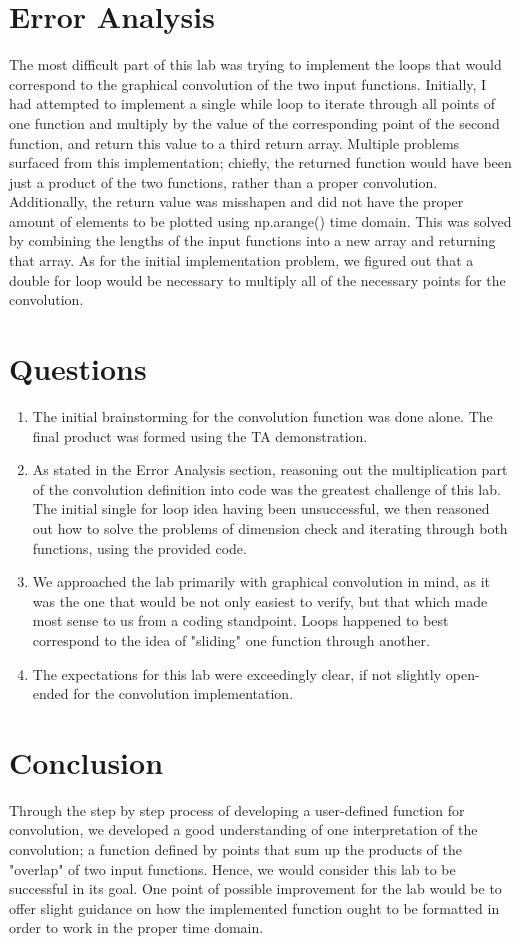 \documentclass[11pt,a4]{article}
\begin{document}
\section{Error Analysis}
The most difficult part of this lab was trying to implement the loops that would correspond to the graphical convolution of the two input functions. Initially, I had attempted to implement a single while loop to iterate through all points of one function and multiply by the value of the corresponding point of the second function, and return this value to a third return array. Multiple problems surfaced from this implementation; chiefly, the returned function would have been just a product of the two functions, rather than a proper convolution. Additionally, the return value was misshapen and did not have the proper amount of elements to be plotted using np.arange() time domain. This was solved by combining the lengths of the input functions into a new array and returning that array. As for the initial implementation problem, we figured out that a double for loop would be necessary to multiply all of the necessary points for the convolution.

\section{Questions}
\begin{enumerate}
	\item The initial brainstorming for the convolution function was done alone. The final product was formed using the TA demonstration.
	\item As stated in the Error Analysis section, reasoning out the multiplication part of the convolution definition into code was the greatest challenge of this lab. The initial single for loop idea having been unsuccessful, we then reasoned out how to solve the problems of dimension check and iterating through both functions, using the provided code.
	\item We approached the lab primarily with graphical convolution in mind, as it was the one that would be not only easiest to verify, but that which made most sense to us from a coding standpoint. Loops happened to best correspond to the idea of "sliding" one function through another.
	\item The expectations for this lab were exceedingly clear, if not slightly open-ended for the convolution implementation.
\end{enumerate}

\section{Conclusion}
Through the step by step process of developing a user-defined function for convolution, we developed a good understanding of one interpretation of the convolution; a function defined by points that sum up the products of the "overlap" of two input functions. Hence, we would consider this lab to be successful in its goal. One point of possible improvement for the lab would be to offer slight guidance on how the implemented function ought to be formatted in order to work in the proper time domain.
\end{document}
